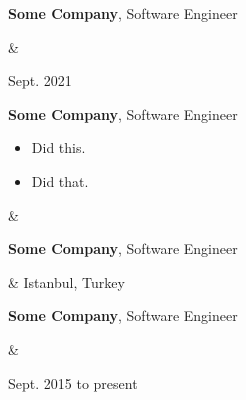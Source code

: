\documentclass[10pt, letterpaper]{article}
\newenvironment{highlights}{
        \begin{itemize}[
                topsep=0pt,
                parsep=0.10 cm,
                partopsep=0pt,
                itemsep=0pt,
                after=\vspace{-1\baselineskip},
                leftmargin=0.4 cm + 3pt
            ]
    }{
        \end{itemize}
    } %
\let\originalTabularx\tabularx
\let\originalEndTabularx\endtabularx
\renewenvironment{tabularx}{\bgroup\centering\originalTabularx}{\originalEndTabularx\par\egroup}
\begin{document}
        \vspace{0.2 cm}
        \begin{tabularx}{
            \textwidth-0.4 cm-0.13cm
        }{
            K{0.2 cm}
            R{4.1 cm}
        }
            \textbf{Some Company}, Software Engineer

            \vspace{0.10 cm}

            &
            

            Sept. 2021
        \end{tabularx}

        \vspace{0.2 cm}
        \begin{tabularx}{
            \textwidth-0.4 cm-0.13cm
        }{
            K{0.2 cm}
            R{4.1 cm}
        }
            \textbf{Some Company}, Software Engineer

            \vspace{0.10 cm}

            \begin{highlights}
                \item Did this.
                \item Did that.
            \end{highlights}
            &
            

            
        \end{tabularx}

        \vspace{0.2 cm}
        \begin{tabularx}{
            \textwidth-0.4 cm-0.13cm
        }{
            K{0.2 cm}
            R{4.1 cm}
        }
            \textbf{Some Company}, Software Engineer

            \vspace{0.10 cm}

            &
            Istanbul, Turkey

            
        \end{tabularx}

        \vspace{0.2 cm}
        \begin{tabularx}{
            \textwidth-0.4 cm-0.13cm
        }{
            K{0.2 cm}
            R{4.1 cm}
        }
            \textbf{Some Company}, Software Engineer

            \vspace{0.10 cm}

            &
            

            Sept. 2015 to present
        \end{tabularx}
\end{document}

